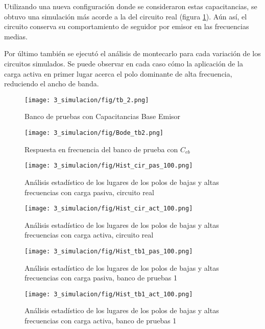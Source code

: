 Utilizando una nueva configuración donde se consideraron estas capacitancias, se obtuvo una simulación más acorde a la del circuito real (figura \ref{fig:bode_tb2}). Aún así, el circuito conserva su comportamiento de seguidor por emisor en las frecuencias medias.

Por último también se ejecutó el análisis de montecarlo para cada variación de los circuitos simulados. Se puede observar en cada caso cómo la aplicación de la carga activa en primer lugar acerca el polo dominante de alta frecuencia, reduciendo el ancho de banda.

\begin{figure}
    \centering
    \texttt{[image: 3\_simulacion/fig/tb\_2.png]}
    \caption{Banco de pruebas con Capacitancias Base Emisor}
\end{figure}

\begin{figure}
    \centering
    \texttt{[image: 3\_simulacion/fig/Bode\_tb2.png]}
    \caption{Respuesta en frecuencia del banco de prueba con $C_{eb}$}
    \label{fig:bode_tb2}
\end{figure}

\begin{figure}
    \centering
    \texttt{[image: 3\_simulacion/fig/Hist\_cir\_pas\_100.png]}
    \caption{Análisis estadístico de los lugares de los polos de bajas y altas frecuencias con carga pasiva, circuito real}
\end{figure}

\begin{figure}
    \centering
    \texttt{[image: 3\_simulacion/fig/Hist\_cir\_act\_100.png]}
    \caption{Análisis estadístico de los lugares de los polos de bajas y altas frecuencias con carga activa, circuito real}
\end{figure}

\begin{figure}
    \centering
    \texttt{[image: 3\_simulacion/fig/Hist\_tb1\_pas\_100.png]}
    \caption{Análisis estadístico de los lugares de los polos de bajas y altas frecuencias con carga pasiva, banco de pruebas 1}
\end{figure}

\begin{figure}
    \centering
    \texttt{[image: 3\_simulacion/fig/Hist\_tb1\_act\_100.png]}
    \caption{Análisis estadístico de los lugares de los polos de bajas y altas frecuencias con carga activa, banco de pruebas 1}
\end{figure}

